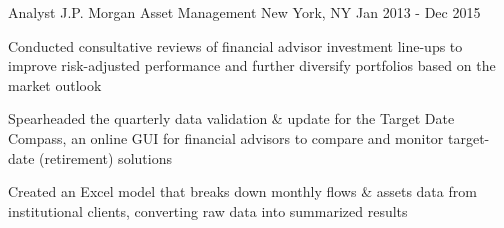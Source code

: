 \begin{cventries}
  \cventry
    {Analyst} %
    {J.P. Morgan Asset Management} %
    {New York, NY} %
    {Jan 2013 - Dec 2015} %
    {
      \begin{cvitems} %
        \item {Conducted consultative reviews of financial advisor investment line-ups to improve risk-adjusted performance and further diversify portfolios based on the market outlook}
        \item {Spearheaded the quarterly data validation \& update for the Target Date Compass, an online GUI for financial advisors to compare and monitor target-date (retirement) solutions}
        \item {Created an Excel model that breaks down monthly flows \& assets data from institutional clients, converting raw data into summarized results}
      \end{cvitems}
    }

\end{cventries}